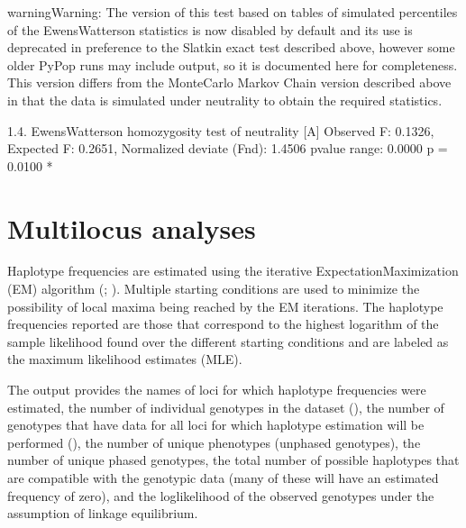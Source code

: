 \documentclass[letterpaper,10pt,english,openany,oneside]{sphinxmanual}
\begin{document}
\begin{sphinxadmonition}{warning}{Warning:}
\sphinxAtStartPar
The version of this test based on tables of simulated percentiles of
the Ewens\sphinxhyphen{}Watterson statistics is now disabled by default and its use
is deprecated in preference to the Slatkin exact test described
above, however some older PyPop runs may include output, so it is
documented here for completeness. This version differs from the
Monte\sphinxhyphen{}Carlo Markov Chain version described above in that the data is
simulated under neutrality to obtain the required statistics.

\begin{sphinxVerbatim}[commandchars=\\\{\}]
1.4. Ewens\PYGZhy{}Watterson homozygosity test of neutrality [A]
\PYGZhy{}\PYGZhy{}\PYGZhy{}\PYGZhy{}\PYGZhy{}\PYGZhy{}\PYGZhy{}\PYGZhy{}\PYGZhy{}\PYGZhy{}\PYGZhy{}\PYGZhy{}\PYGZhy{}\PYGZhy{}\PYGZhy{}\PYGZhy{}\PYGZhy{}\PYGZhy{}\PYGZhy{}\PYGZhy{}\PYGZhy{}\PYGZhy{}\PYGZhy{}\PYGZhy{}\PYGZhy{}\PYGZhy{}\PYGZhy{}\PYGZhy{}\PYGZhy{}\PYGZhy{}\PYGZhy{}\PYGZhy{}\PYGZhy{}\PYGZhy{}\PYGZhy{}\PYGZhy{}\PYGZhy{}\PYGZhy{}\PYGZhy{}\PYGZhy{}\PYGZhy{}\PYGZhy{}\PYGZhy{}\PYGZhy{}\PYGZhy{}\PYGZhy{}\PYGZhy{}\PYGZhy{}\PYGZhy{}\PYGZhy{}\PYGZhy{}\PYGZhy{}\PYGZhy{}\PYGZhy{}\PYGZhy{}\PYGZhy{}
Observed F: 0.1326, Expected F: 0.2651, Normalized deviate (Fnd): \PYGZhy{}1.4506
p\PYGZhy{}value range: 0.0000 \PYGZlt{} p \PYGZlt{}= 0.0100 *
\end{sphinxVerbatim}
\end{sphinxadmonition}


\section{Multi\sphinxhyphen{}locus analyses}
\label{\detokenize{docs/guide-chapter-instructions:multi-locus-analyses}}\label{\detokenize{docs/guide-chapter-instructions:instructions-haplo}}
\sphinxAtStartPar
Haplotype frequencies are estimated using the iterative
Expectation\sphinxhyphen{}Maximization (EM) algorithm (;
). Multiple starting conditions are used to
minimize the possibility of local maxima being reached by the EM
iterations. The haplotype frequencies reported are those that correspond
to the highest logarithm of the sample likelihood found over the
different starting conditions and are labeled as the maximum likelihood
estimates (MLE).

\sphinxAtStartPar
The output provides the names of loci for which haplotype frequencies
were estimated, the number of individual genotypes in the dataset
(), the number of genotypes that have data for all
loci for which haplotype estimation will be performed
(), the number of unique phenotypes (unphased
genotypes), the number of unique phased genotypes, the total number of
possible haplotypes that are compatible with the genotypic data (many of
these will have an estimated frequency of zero), and the log\sphinxhyphen{}likelihood
of the observed genotypes under the assumption of linkage equilibrium.
\end{document}

